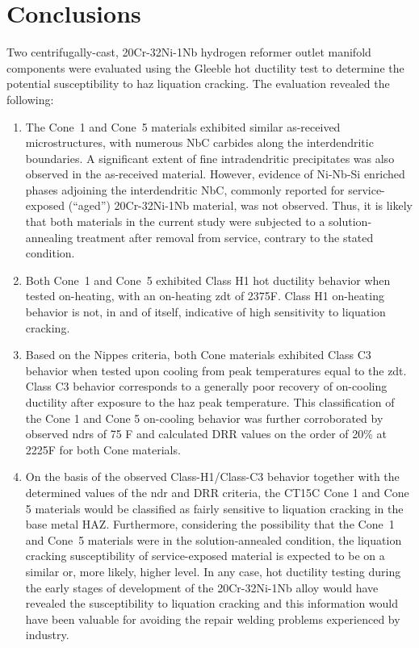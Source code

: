 \chapter{Conclusions} \label{ch:conclusions}
Two centrifugally-cast, 20Cr-32Ni-1Nb hydrogen reformer outlet manifold components were evaluated using the Gleeble hot ductility test to determine the potential susceptibility to \gls{haz} liquation cracking.  The evaluation revealed the following:

\begin{enumerate}
\item The Cone~1 and Cone~5 materials exhibited similar as-received microstructures, with numerous NbC carbides along the interdendritic boundaries. A significant extent of fine intradendritic precipitates was also observed in the as-received material. However, evidence of Ni-Nb-Si enriched phases adjoining the interdendritic NbC, commonly reported for service-exposed (“aged”) 20Cr-32Ni-1Nb material, was not observed. Thus, it is likely that both materials in the current study were subjected to a solution-annealing treatment after removal from service, contrary to the stated condition.
\item Both Cone~1 and Cone~5 exhibited Class H1 hot ductility behavior when tested on-heating, with an on-heating \gls{zdt} of 2375\textdegree{}F. Class H1 on-heating behavior is not, in and of itself, indicative of high sensitivity to liquation cracking.
\item Based on the Nippes criteria, both Cone materials exhibited Class C3 behavior when tested upon cooling from peak temperatures equal to the \gls{zdt}.  Class C3 behavior corresponds to a generally poor recovery of on-cooling ductility after exposure to the \gls{haz} peak temperature.  This classification of the Cone 1 and Cone 5 on-cooling behavior was further corroborated by observed \gls{ndr}s of 75 F\textdegree{} and calculated DRR values on the order of 20\% at 2225\textdegree{}F for both Cone materials.
\item On the basis of the observed Class-H1/Class-C3 behavior together with the determined values of the \gls{ndr} and DRR criteria, the CT15C Cone 1 and Cone 5 materials would be classified as fairly sensitive to liquation cracking in the base metal HAZ. Furthermore, considering the possibility that the Cone~1 and Cone~5 materials were in the solution-annealed condition, the liquation cracking susceptibility of service-exposed material is expected to be on a similar or, more likely, higher level. In any case, hot ductility testing during the early stages of development of the 20Cr-32Ni-1Nb alloy would have revealed the susceptibility to liquation cracking and this information would have been valuable for avoiding the repair welding problems experienced by industry.

\end{enumerate}
